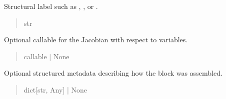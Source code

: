 \documentclass[letterpaper,10pt,english,openany,oneside]{sphinxmanual}
\begin{document}
\begin{fulllineitems}
\begin{fulllineitems}
\end{fulllineitems}


\begin{fulllineitems}
\label{\detokenize{api/core/jaxmodel/constraints:jaxmodel.constraints.ConstraintEntry.structure}}
\pysigstartsignatures
{}
\pysigstopsignatures
\sphinxAtStartPar
Structural label such as , , or .
\begin{quote}\begin{description}
\sphinxAtStartPar
str

\end{description}\end{quote}

\end{fulllineitems}


\begin{fulllineitems}
\label{\detokenize{api/core/jaxmodel/constraints:jaxmodel.constraints.ConstraintEntry.jac_y_fun}}
\pysigstartsignatures
{}
\pysigstopsignatures
\sphinxAtStartPar
Optional callable for the Jacobian with respect to variables.
\begin{quote}\begin{description}
\sphinxAtStartPar
callable | None

\end{description}\end{quote}

\end{fulllineitems}


\begin{fulllineitems}
\label{\detokenize{api/core/jaxmodel/constraints:jaxmodel.constraints.ConstraintEntry.metadata}}
\pysigstartsignatures
{}
\pysigstopsignatures
\sphinxAtStartPar
Optional structured metadata describing how the block was assembled.
\begin{quote}\begin{description}
\sphinxAtStartPar
dict{[}str, Any{]} | None

\end{description}\end{quote}

\end{fulllineitems}


\end{fulllineitems}
\end{document}
